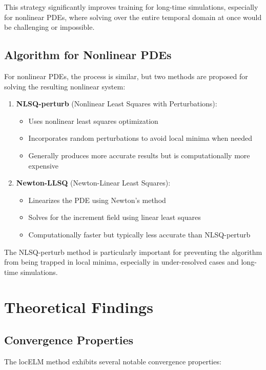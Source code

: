 \documentclass[11pt,a4paper]{article}
\begin{document}
This strategy significantly improves training for long-time simulations, especially for nonlinear PDEs, where solving over the entire temporal domain at once would be challenging or impossible.

\subsection{Algorithm for Nonlinear PDEs}
For nonlinear PDEs, the process is similar, but two methods are proposed for solving the resulting nonlinear system:

\begin{enumerate}
    \item \textbf{NLSQ-perturb} (Nonlinear Least Squares with Perturbations):
    \begin{itemize}
        \item Uses nonlinear least squares optimization
        \item Incorporates random perturbations to avoid local minima when needed
        \item Generally produces more accurate results but is computationally more expensive
    \end{itemize}
    
    \item \textbf{Newton-LLSQ} (Newton-Linear Least Squares):
    \begin{itemize}
        \item Linearizes the PDE using Newton's method
        \item Solves for the increment field using linear least squares
        \item Computationally faster but typically less accurate than NLSQ-perturb
    \end{itemize}
\end{enumerate}

The NLSQ-perturb method is particularly important for preventing the algorithm from being trapped in local minima, especially in under-resolved cases and long-time simulations.

\section{Theoretical Findings}

\subsection{Convergence Properties}
The locELM method exhibits several notable convergence properties:
\end{document}
